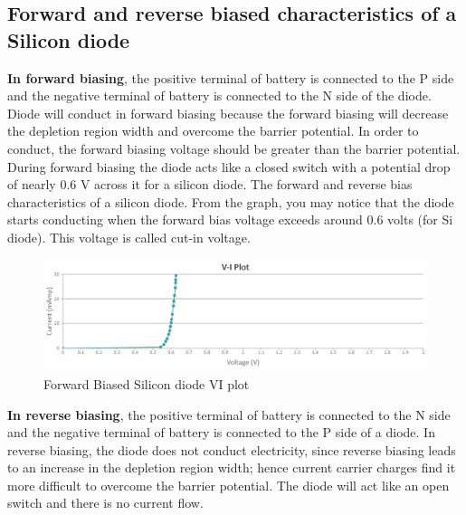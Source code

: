 		\subsection{Forward and reverse biased characteristics of a Silicon diode}
			\textbf{In forward biasing}, the positive terminal of battery is connected to the P side and the negative terminal of battery is connected to the N side of the diode. Diode will conduct in forward biasing because the forward biasing will decrease the depletion region width and overcome the barrier potential. In order to conduct, the forward biasing voltage should be greater than the barrier potential. During forward biasing the diode acts like a closed switch with a potential drop of nearly 0.6 V across it for a silicon diode. The forward and reverse bias characteristics of a silicon diode. From the graph, you may notice that the diode starts conducting when the forward bias voltage exceeds around 0.6 volts (for Si diode). This voltage is called cut-in voltage.
			\begin{figure}[h]
				\centering
				\includegraphics[width=1\linewidth]{img/exp5/5}
				\caption{Forward Biased Silicon diode VI plot}
				\label{fig:pnjfvi}
			\end{figure}
		
			\textbf{In reverse biasing}, the positive terminal of battery is connected to the N side and the negative terminal of battery is connected to the P side of a diode. In reverse biasing, the diode does not conduct electricity, since reverse biasing leads to an increase in the depletion region width; hence current carrier charges find it more difficult to overcome the barrier potential. The diode will act like an open switch and there is no current flow.
			
